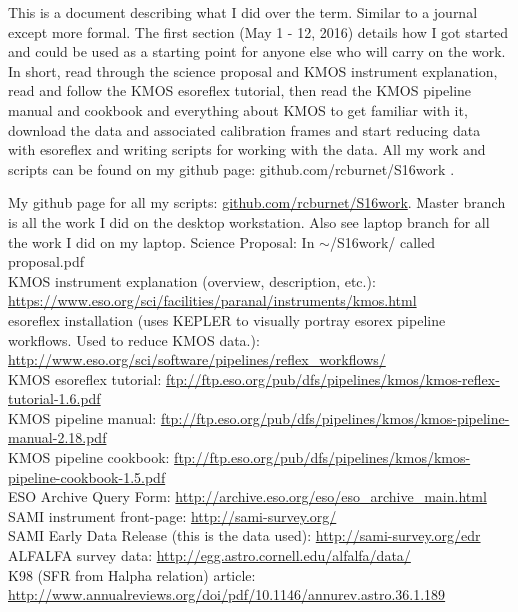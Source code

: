 \documentclass[10pt,letterpaper]{article}
\begin{document}
This is a document describing what I did over the term. Similar to a journal except more formal. The first section (May 1 - 12, 2016) details how I got started and could be used as a starting point for anyone else who will carry on the work. In short, read through the science proposal and KMOS instrument explanation, read and follow the KMOS esoreflex tutorial, then read the KMOS pipeline manual and cookbook and everything about KMOS to get familiar with it, download the data and associated calibration frames and start reducing data with esoreflex and writing scripts for working with the data. All my work and scripts can be found on my github page: github.com/rcburnet/S16work .
\begin{thebibliography}{1}
My github page for all my scripts: \url{github.com/rcburnet/S16work}. Master branch is all the work I did on the desktop workstation. Also see laptop branch for all the work I did on my laptop.
Science Proposal: In $\sim$/S16work/ called proposal.pdf\\
KMOS instrument explanation (overview, description, etc.): \url{https://www.eso.org/sci/facilities/paranal/instruments/kmos.html}\\
esoreflex installation (uses KEPLER to visually portray esorex pipeline workflows. Used to reduce KMOS data.): \url{http://www.eso.org/sci/software/pipelines/reflex_workflows/}\\
KMOS esoreflex tutorial: \url{ftp://ftp.eso.org/pub/dfs/pipelines/kmos/kmos-reflex-tutorial-1.6.pdf}\\
KMOS pipeline manual: \url{ftp://ftp.eso.org/pub/dfs/pipelines/kmos/kmos-pipeline-manual-2.18.pdf}\\
KMOS pipeline cookbook: \url{ftp://ftp.eso.org/pub/dfs/pipelines/kmos/kmos-pipeline-cookbook-1.5.pdf}\\
ESO Archive Query Form: \url{http://archive.eso.org/eso/eso_archive_main.html}
SAMI instrument front-page: \url{http://sami-survey.org/}\\
SAMI Early Data Release (this is the data used): \url{http://sami-survey.org/edr}\\
ALFALFA survey data: \url{http://egg.astro.cornell.edu/alfalfa/data/}\\
K98 (SFR from Halpha relation) article: \url{http://www.annualreviews.org/doi/pdf/10.1146/annurev.astro.36.1.189}\\

\end{thebibliography}
\end{document}
